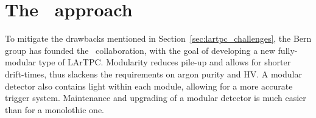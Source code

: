 \chapter{The \AC\ approach\label{chap:argoncube}}
To mitigate the drawbacks mentioned in Section~\ref{sec:lartpc_challenges}, the Bern group has founded the \AC\ collaboration, with the goal of developing a new fully-modular type of LArTPC.
Modularity reduces pile-up and allows for shorter drift-times, thus slackens the requirements on argon purity and HV.
A modular detector also contains light within each module, allowing for a more accurate trigger system.
Maintenance and upgrading of a modular detector is much easier than for a monolothic one.